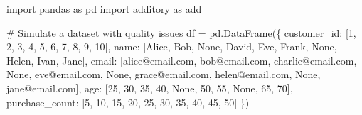 \documentclass[
  letterpaper,
]{scrbook}
\newenvironment{Shaded}{\begin{snugshade}}{\end{snugshade}}
\newcommand{\CommentTok}[1]{\textcolor[rgb]{0.37,0.37,0.37}{#1}}
\newcommand{\DecValTok}[1]{\textcolor[rgb]{0.68,0.00,0.00}{#1}}
\newcommand{\ImportTok}[1]{\textcolor[rgb]{0.00,0.46,0.62}{#1}}
\newcommand{\NormalTok}[1]{\textcolor[rgb]{0.00,0.23,0.31}{#1}}
\newcommand{\OperatorTok}[1]{\textcolor[rgb]{0.37,0.37,0.37}{#1}}
\newcommand{\StringTok}[1]{\textcolor[rgb]{0.13,0.47,0.30}{#1}}
\newcommand{\VariableTok}[1]{\textcolor[rgb]{0.07,0.07,0.07}{#1}}
\begin{document}
\begin{Shaded}
\begin{Highlighting}[]
\ImportTok{import}\NormalTok{ pandas }\ImportTok{as}\NormalTok{ pd}
\ImportTok{import}\NormalTok{ additory }\ImportTok{as}\NormalTok{ add}

\CommentTok{\# Simulate a dataset with quality issues}
\NormalTok{df }\OperatorTok{=}\NormalTok{ pd.DataFrame(\{}
    \StringTok{\textquotesingle{}customer\_id\textquotesingle{}}\NormalTok{: [}\DecValTok{1}\NormalTok{, }\DecValTok{2}\NormalTok{, }\DecValTok{3}\NormalTok{, }\DecValTok{4}\NormalTok{, }\DecValTok{5}\NormalTok{, }\DecValTok{6}\NormalTok{, }\DecValTok{7}\NormalTok{, }\DecValTok{8}\NormalTok{, }\DecValTok{9}\NormalTok{, }\DecValTok{10}\NormalTok{],}
    \StringTok{\textquotesingle{}name\textquotesingle{}}\NormalTok{: [}\StringTok{\textquotesingle{}Alice\textquotesingle{}}\NormalTok{, }\StringTok{\textquotesingle{}Bob\textquotesingle{}}\NormalTok{, }\VariableTok{None}\NormalTok{, }\StringTok{\textquotesingle{}David\textquotesingle{}}\NormalTok{, }\StringTok{\textquotesingle{}Eve\textquotesingle{}}\NormalTok{, }\StringTok{\textquotesingle{}Frank\textquotesingle{}}\NormalTok{, }\VariableTok{None}\NormalTok{, }\StringTok{\textquotesingle{}Helen\textquotesingle{}}\NormalTok{, }\StringTok{\textquotesingle{}Ivan\textquotesingle{}}\NormalTok{, }\StringTok{\textquotesingle{}Jane\textquotesingle{}}\NormalTok{],}
    \StringTok{\textquotesingle{}email\textquotesingle{}}\NormalTok{: [}\StringTok{\textquotesingle{}alice@email.com\textquotesingle{}}\NormalTok{, }\StringTok{\textquotesingle{}bob@email.com\textquotesingle{}}\NormalTok{, }\StringTok{\textquotesingle{}charlie@email.com\textquotesingle{}}\NormalTok{, }\VariableTok{None}\NormalTok{, }
              \StringTok{\textquotesingle{}eve@email.com\textquotesingle{}}\NormalTok{, }\VariableTok{None}\NormalTok{, }\StringTok{\textquotesingle{}grace@email.com\textquotesingle{}}\NormalTok{, }\StringTok{\textquotesingle{}helen@email.com\textquotesingle{}}\NormalTok{, }
              \VariableTok{None}\NormalTok{, }\StringTok{\textquotesingle{}jane@email.com\textquotesingle{}}\NormalTok{],}
    \StringTok{\textquotesingle{}age\textquotesingle{}}\NormalTok{: [}\DecValTok{25}\NormalTok{, }\DecValTok{30}\NormalTok{, }\DecValTok{35}\NormalTok{, }\DecValTok{40}\NormalTok{, }\VariableTok{None}\NormalTok{, }\DecValTok{50}\NormalTok{, }\DecValTok{55}\NormalTok{, }\VariableTok{None}\NormalTok{, }\DecValTok{65}\NormalTok{, }\DecValTok{70}\NormalTok{],}
    \StringTok{\textquotesingle{}purchase\_count\textquotesingle{}}\NormalTok{: [}\DecValTok{5}\NormalTok{, }\DecValTok{10}\NormalTok{, }\DecValTok{15}\NormalTok{, }\DecValTok{20}\NormalTok{, }\DecValTok{25}\NormalTok{, }\DecValTok{30}\NormalTok{, }\DecValTok{35}\NormalTok{, }\DecValTok{40}\NormalTok{, }\DecValTok{45}\NormalTok{, }\DecValTok{50}\NormalTok{]}
\NormalTok{\})}


\end{Highlighting}
\end{Shaded}
\end{document}

